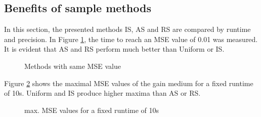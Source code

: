\subsection{Benefits of sample methods}
In this section, the presented methods IS, AS and RS are compared by runtime
and precision.
In Figure \ref{graphic:methods_compare}, the time to reach an
MSE value of 0.01 was measured. It is evident that AS and RS perform
much better than Uniform or IS. 
\begin{figure}[H]
  \centerline{
    }
  \caption{Methods with same MSE value}
  \label{graphic:methods_compare}
\end{figure}
Figure \ref{graphic:methods_compare2} shows the maximal MSE values
of the gain medium for a fixed runtime of 10s. Uniform and IS 
produce higher maxima than AS or RS.
\begin{figure}[H]
  \centerline{
    }
  \caption{max. MSE values for a fixed runtime of 10s}
  \label{graphic:methods_compare2}
\end{figure}
